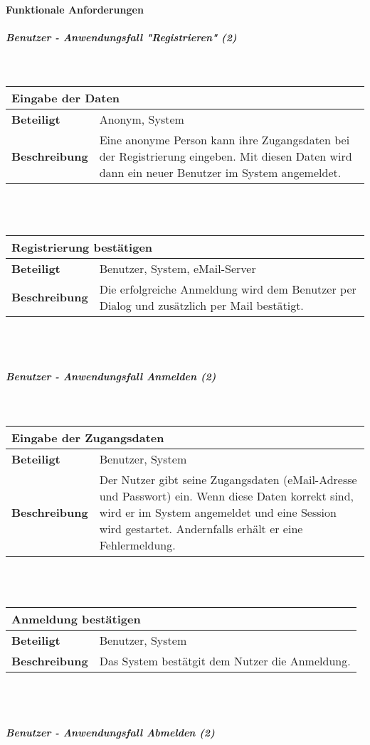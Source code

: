 \documentclass[12pt,a4paper]{article}
\begin{document}
\paragraph{Funktionale Anforderungen}
\subparagraph{Benutzer - Anwendungsfall "Registrieren" (2)}\mbox{}\\

\begin{tabular}{l p{10cm}}
\multicolumn{2}{l}{\textbf{Eingabe der Daten}} \\ \hline
\textbf{Beteiligt} & Anonym, System \\ \hline 
\textbf{Beschreibung} & Eine anonyme Person kann ihre Zugangsdaten bei der Registrierung eingeben. Mit diesen Daten wird dann ein neuer Benutzer im System angemeldet.\\ 
\hline 
\end{tabular}\\\\

\begin{tabular}{l p{10cm}}
\multicolumn{2}{l}{\textbf{Registrierung bestätigen}} \\ \hline
\textbf{Beteiligt} & Benutzer, System, eMail-Server \\ \hline 
\textbf{Beschreibung} & Die erfolgreiche Anmeldung wird dem Benutzer per Dialog und zusätzlich per Mail bestätigt.\\ 
\hline 
\end{tabular}\\\\
\subparagraph{Benutzer - Anwendungsfall \glqq Anmelden \grqq (2)}\mbox{}\\

\begin{tabular}{l p{10cm}}
\multicolumn{2}{l}{\textbf{Eingabe der Zugangsdaten}} \\ \hline
\textbf{Beteiligt} & Benutzer, System \\ \hline 
\textbf{Beschreibung} & Der Nutzer gibt seine Zugangsdaten (eMail-Adresse und Passwort) ein. Wenn diese Daten korrekt sind, wird er im System angemeldet und eine Session wird gestartet. Andernfalls erhält er eine Fehlermeldung.\\ 
\hline 
\end{tabular}\\\\

\begin{tabular}{l p{10cm}}
\multicolumn{2}{l}{\textbf{Anmeldung bestätigen}} \\ \hline
\textbf{Beteiligt} & Benutzer, System \\ \hline 
\textbf{Beschreibung} & Das System bestätgit dem Nutzer die Anmeldung.\\ 
\hline 
\end{tabular}\\\\
\subparagraph{Benutzer - Anwendungsfall \glqq Abmelden \grqq (2)}\mbox{}\\
\end{document}
